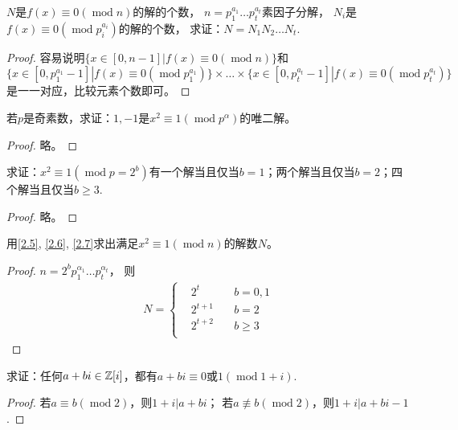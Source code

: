 \begin{exercise}\label{2.5}
    $N$是$f(x)\equiv0(\operatorname{mod}n)$的解的个数，
    $n=p_1^{a_1}\ldots p_t^{a_t}$素因子分解，
    $N_i$是$f(x)\equiv0(\operatorname{mod}p_i^{a_i})$的解的个数，
    求证：$N=N_1 N_2\ldots N_t$.
\end{exercise}
\begin{proof}
    容易说明$\{x\in[0,n-1]|f(x)\equiv0(\operatorname{mod}n)\}$和
    $\{x\in[0,p_1^{a_1}-1]|f(x)\equiv0(\operatorname{mod}p_1^{a_1})\}\times\ldots
    \times\{x\in[0,p_t^{a_t}-1]|f(x)\equiv0(\operatorname{mod}p_t^{a_t})\}$
    是一一对应，比较元素个数即可。
\end{proof}

\begin{exercise}\label{2.6}
    若$p$是奇素数，求证：$1,-1$是$x^2\equiv1(\operatorname{mod}p^\alpha)$的唯二解。
\end{exercise}
\begin{proof}
    略。
\end{proof}

\begin{exercise}\label{2.7}
    求证：$x^2\equiv1(\operatorname{mod}p=2^b)$有一个解当且仅当$b=1$；两个解当且仅当$b=2$；四个解当且仅当$b\geqslant3$.
\end{exercise}
\begin{proof}
    略。
\end{proof}

\begin{exercise}
 用\ref{2.5}, \ref{2.6}, \ref{2.7}求出满足$x^2\equiv1(\operatorname{mod}n)$的解数$N$。
\end{exercise}
\begin{proof}
 $n=2^bp_1^{\alpha_1}\ldots p_t^{\alpha_t}$，
 则\begin{align*}
    N=\left\{ 
    \begin{aligned}
        &2^t\quad&b=0,1\\
        &2^{t+1}\quad&b=2\\
        &2^{t+2}\quad&b\geqslant3\\
    \end{aligned}
     \right.
 \end{align*}
\end{proof}

\begin{exercise}
    求证：任何$a+bi\in\mathbb{Z}[i]$，都有$a+bi\equiv0$或$1(\operatorname{mod}1+i)$.
\end{exercise}
\begin{proof}
    若$a\equiv b(\operatorname{mod}2)$，则$1+i|a+bi$；
    若$a\not\equiv b(\operatorname{mod}2)$，则$1+i|a+bi-1$.
\end{proof}

